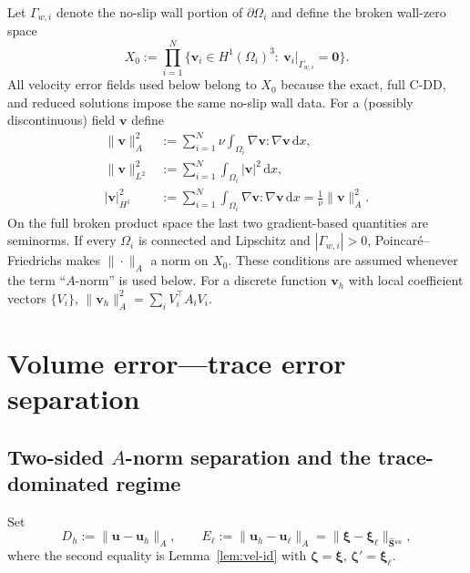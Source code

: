 \documentclass[11pt,a4paper]{article}
\theoremstyle{definition}
\newcommand{\pore}[1]{\Omega_{#1}}
\newcommand{\vel}{\bm{u}}
\newcommand{\Schur}{\mathbf{S}}
\newcommand{\Shatuu}{\widehat{\Schur}{}^{uu}}
\newcommand{\zero}{\bm{0}}
\begin{document}
Let $\Gamma_{w,i}$ denote the no-slip wall portion of
$\partial\pore{i}$ and define the broken wall-zero space
\[
  X_0:=\prod_{i=1}^N
  \{\bm{v}_i\in H^1(\pore{i})^3:\ \bm{v}_i|_{\Gamma_{w,i}}=\zero\}.
\]
All velocity error fields used below belong to $X_0$ because the exact,
full C-DD, and reduced solutions impose the same no-slip wall data.
For a (possibly discontinuous) field $\bm{v}$ define
\begin{align}
  \|\bm{v}\|_A^2 &:= \sum_{i=1}^N \nu\int_{\pore{i}}
                     \nabla\bm{v}:\nabla\bm{v}\,\mathrm{d}x,
                     \label{eq:A-norm} \\[4pt]
  \|\bm{v}\|_{L^2}^2 &:= \sum_{i=1}^N \int_{\pore{i}}
                         |\bm{v}|^2\,\mathrm{d}x, \label{eq:L2-norm} \\[4pt]
  |\bm{v}|_{H^1}^2 &:= \sum_{i=1}^N \int_{\pore{i}}
                        \nabla\bm{v}:\nabla\bm{v}\,\mathrm{d}x
                        = \frac{1}{\nu}\|\bm{v}\|_A^2. \label{eq:H1-semi}
\end{align}
On the full broken product space the last two gradient-based quantities
are seminorms.  If every $\pore{i}$ is connected and Lipschitz and
$|\Gamma_{w,i}|>0$, Poincar\'e--Friedrichs makes $\|\cdot\|_A$ a norm
on $X_0$.  These conditions are assumed whenever the term ``$A$-norm''
is used below.  For a discrete function $\bm{v}_h$ with local coefficient
vectors $\{V_i\}$,
$\|\bm{v}_h\|_A^2 = \sum_i V_i^\top A_i V_i$.

\section{Volume error---trace error separation}

\subsection{Two-sided $A$-norm separation and the trace-dominated regime}

Set
\begin{equation}\label{eq:DE}
  D_h := \|\vel - \vel_h\|_A,\qquad
  E_\ell := \|\vel_h - \vel_\ell\|_A
          = \|\bm{\xi} - \bm{\xi}_\ell\|_{\Shatuu},
\end{equation}
where the second equality is Lemma~\ref{lem:vel-id} with
$\bm{\zeta}=\bm{\xi}$, $\bm{\zeta}'=\bm{\xi}_\ell$.
\end{document}
